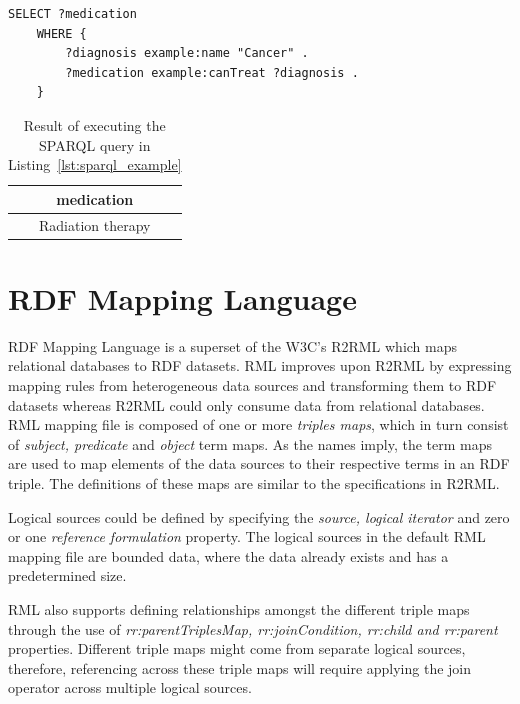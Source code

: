 \begin{lstlisting}[language=SPARQL,
    caption={Example of a SPARQL query of a medication.}, 
    label={lst:sparql_example}]
    SELECT ?medication
    WHERE {
        ?diagnosis example:name "Cancer" .
        ?medication example:canTreat ?diagnosis .
    }
\end{lstlisting}


\begin{table}[htbp]
    \centering
    \begin{tabular}{|c|}
    \hline
    \textbf{medication}        \\ \hline
    Radiation therapy \\ \hline
    \end{tabular}
    \caption{Result of executing the SPARQL query in Listing~\ref{lst:sparql_example}}
    \label{tab:sparql_result}
\end{table}


\section{RDF Mapping Language}
RDF Mapping Language\cite{rml} is a superset of the W3C's R2RML\cite{r2rml} which maps relational databases to
RDF datasets. RML improves upon R2RML by expressing mapping rules from heterogeneous
data sources and transforming them to RDF datasets whereas R2RML could only consume
data from relational databases. RML mapping file is composed of one or more \emph{triples maps}, 
which in turn consist of \emph{subject, predicate} and \emph{object} term maps. As the names imply, 
the term maps are used to map elements of the data sources to their respective terms 
in an RDF triple. The definitions of these maps are similar to the 
specifications in R2RML\cite{rml_tech}. 

Logical sources could be defined by specifying the \emph{source, logical iterator} 
and zero or one \emph{reference formulation} property. The logical sources in the default 
RML mapping file are bounded data, where the data already exists and has a predetermined
size. 

RML also supports defining relationships amongst the different 
triple maps through the use of \textit{rr:parentTriplesMap, rr:joinCondition, rr:child and rr:parent}
properties. Different triple maps might come from separate logical sources, therefore, 
referencing across these triple maps will require applying the join operator across multiple 
logical sources. 


